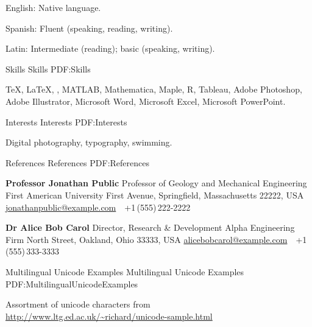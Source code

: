 \documentclass[letterpaper,MMMyyyy,nonstopmode]{simpleresumecv}
\begin{document}
\begin{Body}
\BulletItem
English: Native language.

\Gap
\BulletItem
Spanish: Fluent (speaking, reading, writing).

\Gap
\BulletItem
Latin: Intermediate (reading); basic (speaking, writing).


\Section
{Skills}
{Skills}
{PDF:Skills}

\Entry
{\TeX}, {\LaTeX}, {\XeLaTeX},
MATLAB,
Mathematica,
Maple,
R,
Tableau,
Adobe Photoshop,
Adobe Illustrator,
Microsoft Word,
Microsoft Excel,
Microsoft PowerPoint.


\Section
{Interests}
{Interests}
{PDF:Interests}

\Entry
Digital photography,
typography,
swimming.


\Section
{References}
{References}
{PDF:References}

\BulletItem
\textbf{Professor Jonathan Public}
\newline
Professor of Geology and Mechanical Engineering
\newline
First American University
 First Avenue, Springfield, Massachusetts 22222, USA
\newline
\href{mailto:jonathanpublic@example.com}
{jonathanpublic@example.com}
\,\SubBulletSymbol\,
+1\,(555)\,222-2222

\BigGap
\BulletItem
\textbf{Dr Alice Bob Carol}
\newline
Director, Research \& Development
\newline
Alpha Engineering Firm
 North Street, Oakland, Ohio 33333, USA
\newline
\href{mailto:alicebobcarol@example.com}
{alicebobcarol@example.com}
\,\SubBulletSymbol\,
+1\,(555)\,333-3333


\Section
{Multilingual Unicode Examples}
{Multilingual Unicode Examples}
{PDF:MultilingualUnicodeExamples}

\BulletItem
Assortment of unicode characters from
\href{http://www.ltg.ed.ac.uk/~richard/unicode-sample.html}
{\url{http://www.ltg.ed.ac.uk/~richard/unicode-sample.html}}


\end{Body}
\end{document}
